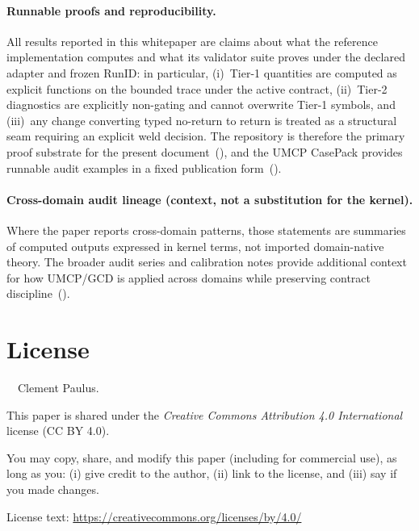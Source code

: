 \documentclass[
  aps,
  prd,
  preprint,
  superscriptaddress,
  nofootinbib,
  floatfix
]{revtex4-2}
\begin{document}
\paragraph{Runnable proofs and reproducibility.}
All results reported in this whitepaper are claims about
what the reference implementation computes and what its
validator suite proves under the declared adapter and
frozen RunID: in particular,
(i)~Tier-1 quantities are computed as explicit functions on
the bounded trace under the active contract,
(ii)~Tier-2 diagnostics are explicitly non-gating and cannot
overwrite Tier-1 symbols, and
(iii)~any change converting typed no-return to return is
treated as a structural seam requiring an explicit weld
decision.
The repository is therefore the primary proof substrate for
the present
document~(\cite{umcpmetadatarepo}), and the UMCP CasePack
provides runnable audit examples in a fixed publication
form~(\cite{paulus2026umcpcasepack}).

\paragraph{Cross-domain audit lineage (context, not a substitution for the kernel).}
Where the paper reports cross-domain patterns, those
statements are summaries of computed outputs expressed in
kernel terms, not imported domain-native theory. The broader
audit series and calibration notes provide additional context
for how UMCP/GCD is applied across domains while preserving
contract
discipline~(\cite{paulus2025procurement,paulus2025hawking,paulus2025isinganyon,paulus2025activematter,paulus2025toolkit}).

\clearpage


\clearpage
\section*{License}

\noindent\textcopyright\ \the\year\ Clement Paulus.

\medskip
\noindent This paper is shared under the \textit{Creative Commons Attribution 4.0 International} license (CC BY 4.0).

\medskip
\noindent You may copy, share, and modify this paper (including for commercial use), as long as you:
(i) give credit to the author, (ii) link to the license, and (iii) say if you made changes.

\medskip
\noindent License text: \url{https://creativecommons.org/licenses/by/4.0/}
\end{document}

